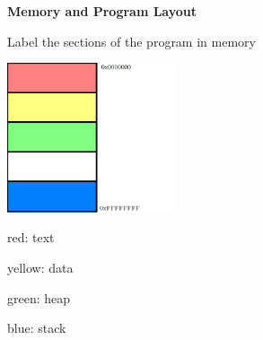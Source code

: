 \textbf{Memory and Program Layout}

Label the sections of the program in memory

\includegraphics[width=50mm]{other/programstructure.png}

\begin{answer}
red: text

yellow: data

green: heap

blue: stack
\end{answer}